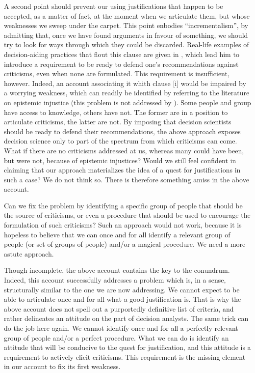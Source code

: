 \documentclass[preprint, french, english, 11pt, authoryear]{elsarticle}%
\begin{document}
A second point should prevent our using justifications that happen to be accepted, as a matter of fact, at the moment when we articulate them, but whose weaknesses we sweep under the carpet. This point enbodies ``incrementalism'', by admitting that, once we have found arguments in favour of something, we should try to look for ways through which they could be discarded. Real-life examples of decision-aiding practices that flout this clause are given in \cite{meinard_what_2017}, which lead him to introduce a requirement to be ready to defend one's recommendations against criticisms, even when none are formulated. This requirement is insufficient, however. Indeed, an account associating it whith clause [i] would be impaired by a worrying weakness, which can readily be identified by referring to the literature on epistemic injustice \cite{fricker_epistemic_2007} (this problem is not addressed by \cite{meinard_what_2017}). Some people and group have access to knowledge, others have not. The former are in a position to articulate criticisms, the latter are not. By imposing that decision scientists should be ready to defend their recommendations, the above approach exposes decision science only to part of the spectrum from which criticisms can come. What if there are no criticisms addressed at us, whereas many could have been, but were not, because of epistemic injustices? Would we still feel confident in claiming that our approach materializes the idea of a quest for justifications in such a case? We do not think so. There is therefore something amiss in the above account.

Can we fix the problem by identifying a specific group of people that should be the source of criticisms, or even a procedure that should be used to encourage the formulation of such criticisms? Such an approach would not work, because it is hopeless to believe that we can once and for all identify a relevant group of people (or set of groups of people) and/or a magical procedure. We need a more astute approach.

Though incomplete, the above account contains the key to the conundrum. Indeed, this account successfully addresses a problem which is, in a sense, structurally similar to the one we are now addressing. We cannot expect to be able to articulate once and for all what a good justification is. That is why the above account does not spell out a purportedly definitive list of criteria, and rather delineates an attitude on the part of decision analysts. The same trick can do the job here again. We cannot identify once and for all a perfectly relevant group of people and/or a perfect procedure. What we can do is identify an attitude that will be conducive to the quest for justification, and this attitude is a requirement to actively elicit criticisms. This requirement is the missing element in our account to fix its first weakness.
\end{document}
